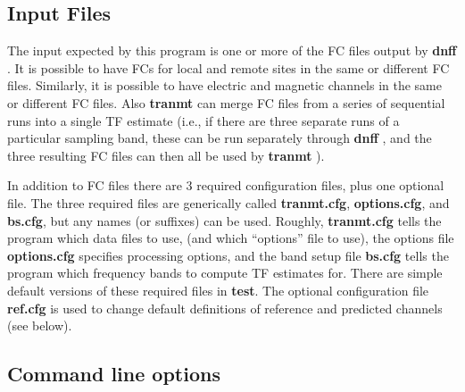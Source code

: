 \subsection{Input Files}

The input expected by this program is one or more of
the FC files output by {\bf dnff} .
It is possible to have FCs for local and remote sites in 
the same or different FC files.  Similarly, it is possible to have
electric and magnetic channels in the same or different FC files.
Also {\bf tranmt} can merge FC files from a series of sequential
runs into a single TF estimate (i.e., if there are three separate
runs of a particular sampling band, these can be run separately through
{\bf dnff} , and the three resulting FC files can then all
be used by {\bf tranmt} ).

In addition to FC files there are 3 required configuration files,
plus one optional file.
The three required files
are generically called {\bf tranmt.cfg}, {\bf options.cfg},
and {\bf bs.cfg}, but any names (or suffixes) can be used. 
Roughly, {\bf tranmt.cfg} tells the program which data files to use,
(and which ``options'' file to use), the options file {\bf options.cfg}
specifies processing options, and the band setup file {\bf bs.cfg}
tells the program which frequency bands to compute TF estimates for.
There are simple default versions of these required files in {\bf test}.
The optional configuration file {\bf ref.cfg}
is used to change default definitions of
reference and predicted channels (see below).

\subsection{Command line options}

